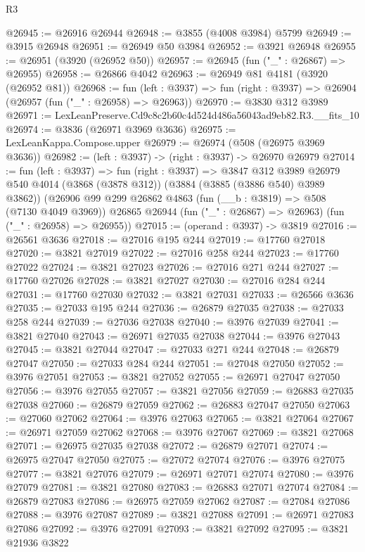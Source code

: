 \begin{lexlean}{R3}
\begin{coremodule}
@26945 := @26916 @26944
@26948 := @3855 (@4008 @3984) @5799
@26949 := @3915 @26948
@26951 := @26949 @50 @3984
@26952 := @3921 @26948
@26955 := @26951 (@3920 (@26952 @50))
@26957 := @26945 (fun ("_" : @26867) => @26955)
@26958 := @26866 @4042
@26963 := @26949 @81 @4181 (@3920 (@26952 @81))
@26968 := fun (left : @3937) =>
  fun (right : @3937) => @26904 (@26957 (fun ("_" : @26958) => @26963))
@26970 := @3830 @312 @3989
@26971 := LexLeanPreserve.Cd9c8c2b60c4d524d486a56043ad9eb82.R3.__fits_10
@26974 := @3836 (@26971 @3969 @3636)
@26975 := LexLeanKappa.Compose.upper
@26979 := @26974 (@508 (@26975 @3969 @3636))
@26982 := (left : @3937) -> (right : @3937) -> @26970 @26979
@27014 := fun (left : @3937) =>
  fun (right : @3937) =>
  @3847
    @312
    @3989
    @26979
    @540
    @4014
    (@3868 (@3878 @312))
    (@3884 (@3885 (@3886 @540) @3989 @3862))
    (@26906
      @99
      @299
      @26862
      @4863
      (fun (__b : @3819) => @508 (@7130 @4049 @3969))
      @26865
      @26944
      (fun ("_" : @26867) => @26963)
      (fun ("_" : @26958) => @26955))
@27015 := (operand : @3937) -> @3819
@27016 := @26561 @3636
@27018 := @27016 @195 @244
@27019 := @17760 @27018
@27020 := @3821 @27019
@27022 := @27016 @258 @244
@27023 := @17760 @27022
@27024 := @3821 @27023
@27026 := @27016 @271 @244
@27027 := @17760 @27026
@27028 := @3821 @27027
@27030 := @27016 @284 @244
@27031 := @17760 @27030
@27032 := @3821 @27031
@27033 := @26566 @3636
@27035 := @27033 @195 @244
@27036 := @26879 @27035
@27038 := @27033 @258 @244
@27039 := @27036 @27038
@27040 := @3976 @27039
@27041 := @3821 @27040
@27043 := @26971 @27035 @27038
@27044 := @3976 @27043
@27045 := @3821 @27044
@27047 := @27033 @271 @244
@27048 := @26879 @27047
@27050 := @27033 @284 @244
@27051 := @27048 @27050
@27052 := @3976 @27051
@27053 := @3821 @27052
@27055 := @26971 @27047 @27050
@27056 := @3976 @27055
@27057 := @3821 @27056
@27059 := @26883 @27035 @27038
@27060 := @26879 @27059
@27062 := @26883 @27047 @27050
@27063 := @27060 @27062
@27064 := @3976 @27063
@27065 := @3821 @27064
@27067 := @26971 @27059 @27062
@27068 := @3976 @27067
@27069 := @3821 @27068
@27071 := @26975 @27035 @27038
@27072 := @26879 @27071
@27074 := @26975 @27047 @27050
@27075 := @27072 @27074
@27076 := @3976 @27075
@27077 := @3821 @27076
@27079 := @26971 @27071 @27074
@27080 := @3976 @27079
@27081 := @3821 @27080
@27083 := @26883 @27071 @27074
@27084 := @26879 @27083
@27086 := @26975 @27059 @27062
@27087 := @27084 @27086
@27088 := @3976 @27087
@27089 := @3821 @27088
@27091 := @26971 @27083 @27086
@27092 := @3976 @27091
@27093 := @3821 @27092
@27095 := @3821 @21936 @3822

\end{coremodule}
\end{lexlean}
